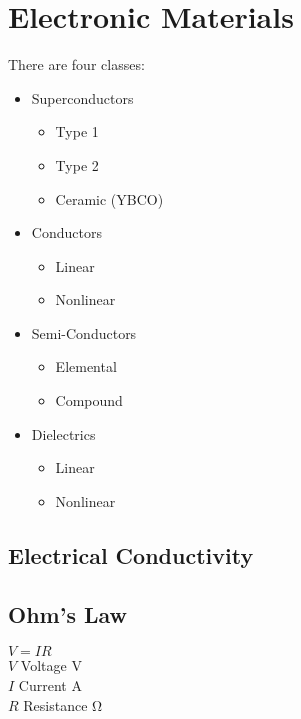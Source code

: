 \documentclass{article}
\begin{document}
\section*{Electronic Materials}
There are four classes:
\begin{itemize}
    \item Superconductors
          \begin{itemize}
              \item Type 1
              \item Type 2
              \item Ceramic (YBCO)
          \end{itemize}
    \item Conductors
          \begin{itemize}
              \item Linear
              \item Nonlinear
          \end{itemize}
    \item Semi-Conductors
          \begin{itemize}
              \item Elemental
              \item Compound
          \end{itemize}
    \item Dielectrics
          \begin{itemize}
              \item Linear
              \item Nonlinear
          \end{itemize}
\end{itemize}
\subsection*{Electrical Conductivity}

\subsection*{Ohm's Law}
$V = IR$\\
$V$ Voltage \si{\volt}\\
$I$ Current \si{\ampere}\\
$R$ Resistance \si{\ohm}
\end{document}
